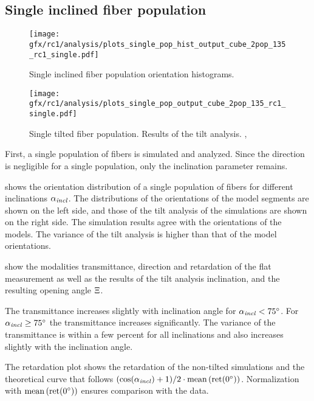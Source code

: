 \subsection{Single inclined fiber population}
\label{sec:resSingleIncl}
%
\begin{figure}[!t]
\centering
\texttt{[image: gfx/rc1/analysis/plots\_single\_pop\_hist\_output\_cube\_2pop\_135\_rc1\_single.pdf]}
\caption{Single inclined fiber population orientation histograms. }
\label{fig:single_fiber_pop_hist}
\end{figure}
%
\begin{figure}[!p]
\centering
\texttt{[image: gfx/rc1/analysis/plots\_single\_pop\_output\_cube\_2pop\_135\_rc1\_single.pdf]}
\caption{Single tilted fiber population. Results of the tilt analysis. , }
\label{fig:single_fiber_pop_rofl}
\end{figure}
%
First, a single population of fibers is simulated and analyzed.
Since the direction is negligible for a single population, only the inclination parameter \modelInc{} remains.
\par
%
 shows the orientation distribution of a single population of fibers for different inclinations $\textnormal{$\alpha_{\mathit{incl}}$}{}$.
The distributions of the orientations of the model segments are shown on the left side, and those of the tilt analysis of the simulations are shown on the right side.
The simulation results agree with the orientations of the models.
The variance of the tilt analysis is higher than that of the model orientations.
\par
%
 show the modalities transmittance, direction and retardation of the flat measurement as well as the results of the tilt analysis inclination, \trel{} and the resulting opening angle $\textnormal{$\Xi$}$.
\par
% 
The transmittance increases slightly with inclination angle for $\textnormal{$\alpha_{\mathit{incl}}$}<\SI{75}{\degree}$.
For $\textnormal{$\alpha_{\mathit{incl}}$} \ge \SI{75}{\degree}$ the transmittance increases significantly.
The variance of the transmittance is within a few percent for all inclinations and also increases slightly with the inclination angle.
\par
%
The retardation plot shows the retardation of the non-tilted simulations and the theoretical curve that follows $(\cos(\textnormal{$\alpha_{\mathit{incl}}$}) + 1) / 2 \cdot \operatorname{mean}\left(\mathrm{ret}(\SI{0}{\degree})\right)$.
Normalization with $\operatorname{mean}\left(\mathrm{ret}(\SI{0}{\degree})\right)$ ensures comparison with the data.
